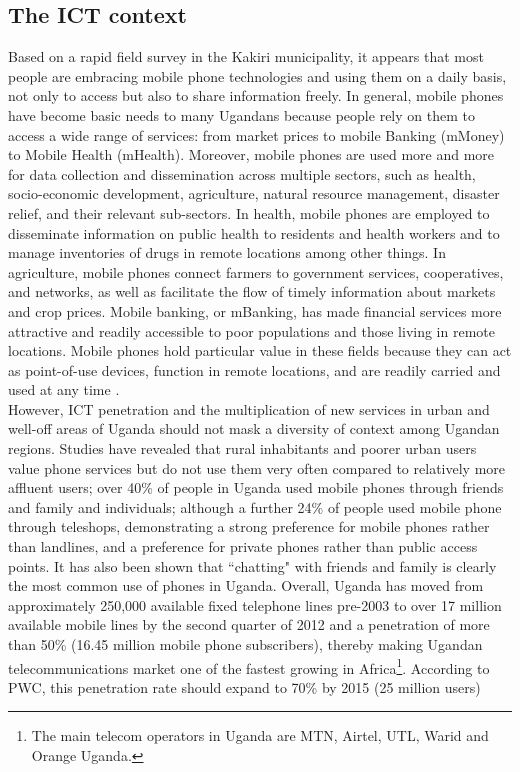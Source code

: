 \documentclass[11pt]{article}
\begin{document}
\subsection{The ICT context}
Based on a rapid field survey in the Kakiri municipality, it appears that most people are embracing mobile phone technologies and using them on a daily basis, not only to access but also to share information freely. In general, mobile phones have become basic needs to many Ugandans because people rely on them to access a wide range of services: from market prices to mobile Banking (mMoney) to Mobile Health (mHealth).
Moreover, mobile phones are used more and more for data collection and dissemination across multiple sectors, such as health, socio-economic development, agriculture, natural resource management, disaster relief, and their relevant sub-sectors. In health, mobile phones are employed to disseminate information on public health to residents and health workers and to manage inventories of drugs in remote locations among other things. In agriculture, mobile phones connect farmers to government services, cooperatives, and networks, as well as facilitate the flow of timely information about markets and crop prices. Mobile banking, or mBanking, has made financial services more attractive and readily accessible to poor populations and those living in remote locations\cite{Rikke10}. Mobile phones hold particular value in these fields because they can act as point-of-use devices, function in remote locations, and are readily carried and used at any time \cite{Kimberly11}\cite{Rikke10}.
\\
However, ICT penetration and the multiplication of new services in urban and well-off areas of Uganda should not mask a diversity of context among Ugandan regions. Studies have revealed that rural inhabitants and poorer urban users value phone services but do not use them very often compared to relatively more affluent users; over 40\% of people in Uganda used mobile phones through friends and family and individuals; although a further 24\% of people used mobile phone through teleshops, demonstrating a strong preference for mobile phones rather than landlines, and a preference for private phones rather than public access points. It has also been shown that ``chatting" with friends and family is clearly the most common use of phones in Uganda\cite{ Scott04}. Overall, Uganda has moved from approximately 250,000 available fixed telephone lines pre-2003 to over 17 million available mobile lines by the second quarter of 2012 and a penetration of more than 50\% (16.45 million mobile phone subscribers), thereby making Ugandan telecommunications market one of the fastest growing in Africa\footnote{The main telecom operators in Uganda are MTN, Airtel, UTL, Warid and Orange Uganda.}. According to PWC, this penetration rate should expand to 70\% by 2015 (25 million users) 
\end{document}
